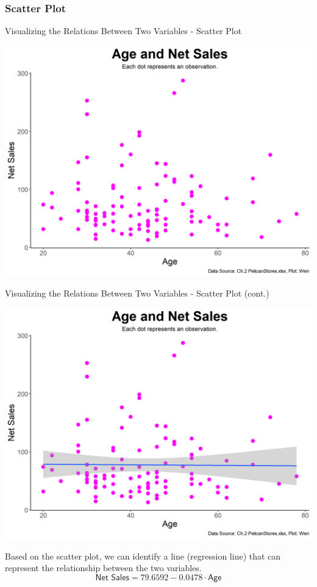 \documentclass{beamer}
\begin{document}
\subsubsection{Scatter Plot}
\begin{frame}{Visualizing the Relations Between Two Variables - Scatter Plot}

\begin{center}
\includegraphics[scale=0.45]{images/ch2AgeNetSales.png}

\end{center}
\end{frame}

\begin{frame}{Visualizing the Relations Between Two Variables - Scatter Plot (cont.)}

\begin{center}
\includegraphics[scale=0.35]{images/ch2AgeNetSalesRegression.png}

Based on the scatter plot, we can identify a line (regression line) that can represent the relationship between the two variables.
$$\textsf{Net Sales} = 79.6592 -0.0478 \cdot \textsf{Age}$$
\end{center}
\end{frame}
\end{document}
